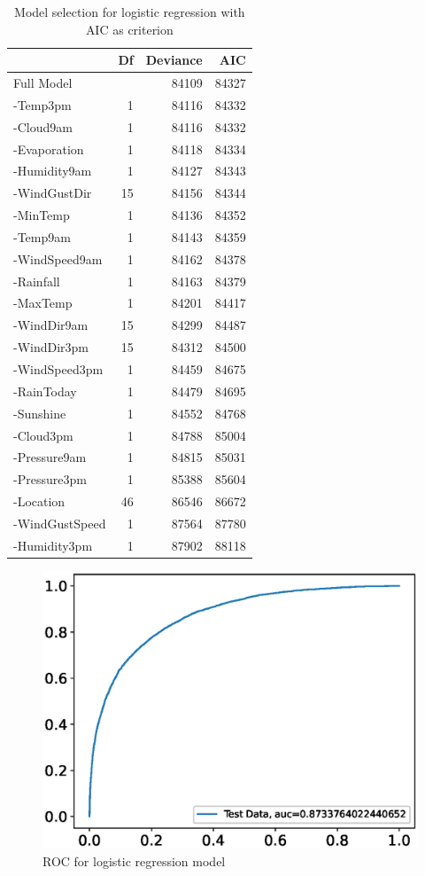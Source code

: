 \documentclass[11pt, a4paper, jou]{apa7}
\begin{document}
\begin{table}[p]
    \centering
    \caption{Model selection for logistic regression with AIC as criterion}
    \label{tab:model_selection_aic}
    \begin{tabular}{lrrr}
    \hline
                   & Df & Deviance & AIC                          \\ \hline
    Full Model     &    & 84109    & {\color[HTML]{FE0000} 84327} \\
    -Temp3pm       & 1  & 84116    & 84332                        \\
    -Cloud9am      & 1  & 84116    & 84332                        \\
    -Evaporation   & 1  & 84118    & 84334                        \\
    -Humidity9am   & 1  & 84127    & 84343                        \\
    -WindGustDir   & 15 & 84156    & 84344                        \\
    -MinTemp       & 1  & 84136    & 84352                        \\
    -Temp9am       & 1  & 84143    & 84359                        \\
    -WindSpeed9am  & 1  & 84162    & 84378                        \\
    -Rainfall      & 1  & 84163    & 84379                        \\
    -MaxTemp       & 1  & 84201    & 84417                        \\
    -WindDir9am    & 15 & 84299    & 84487                        \\
    -WindDir3pm    & 15 & 84312    & 84500                        \\
    -WindSpeed3pm  & 1  & 84459    & 84675                        \\
    -RainToday     & 1  & 84479    & 84695                        \\
    -Sunshine      & 1  & 84552    & 84768                        \\
    -Cloud3pm      & 1  & 84788    & 85004                        \\
    -Pressure9am   & 1  & 84815    & 85031                        \\
    -Pressure3pm   & 1  & 85388    & 85604                        \\
    -Location      & 46 & 86546    & 86672                        \\
    -WindGustSpeed & 1  & 87564    & 87780                        \\
    -Humidity3pm   & 1  & 87902    & 88118                        \\ \hline
    \end{tabular}
    \end{table}
    

\begin{figure}[p]
    \centering
    \caption{ROC for logistic regression model}\label{fig:logistic_roc}
    \includegraphics[width=.45\textwidth]{figures/Roc.eps}
\end{figure}
\end{document}
